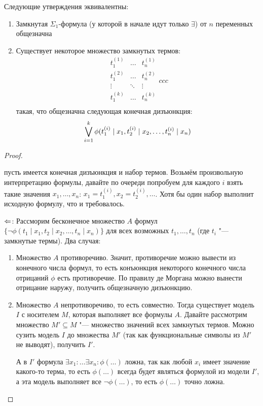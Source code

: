 \begin{theorem}[Эрбрана]
	Следующие утверждения эквивалентны:
	\begin{enumerate}
		\item
			Замкнутая $\Sigma_1$-формула (у которой в начале идут только $\exists$) от $n$ переменных общезначна
		\item
			Существует некоторое множество замкнутых термов:
			\[
			\begin{array}{ccc}
			t_1^{(1)} & \dots & t_n^{(1)} \\
			t_1^{(2)} & \dots & t_n^{(2)} \\
			\vdots & \ddots & \vdots \\
			t_1^{(k)} & \dots & t_n^{(k)} \\
			\end{array}{ccc}
			\]
			такая, что общезначна следующая конечная дизъюнкция:
			\[
				\bigvee_{i=1}^k
					\phi(t_1^{(i)}\mid x_1, t_2^{(i)} \mid x_2, \dots, t_n^{(i)} \mid x_n)
			\]
	\end{enumerate}
\end{theorem}
\begin{proof}
	\begin{description}
		\item[$\Ra$:]
			пусть имеется конечная дизъюнкция и набор термов.
			Возьмём произвольную интерпретацию формулы, давайте по очереди попробуем
			для каждого $i$ взять такие значения $x_1, \dots, x_n$:
			$x_1=t_1^{(i)}, x_2=t_2^{(i)}, \dots$.
			Хотя бы один набор выполнит исходную формулу, что и требовалось.
		\item{$\Leftarrow$:}
			Рассморим бесконечное множество $A$ формул $\{ \lnot \phi(t_1 \mid x_1, t_2 \mid x_2, \dots, t_n \mid x_n) \}$
			для всех возможных $t_1, \dots, t_n$ (где $t_i$ "--- замкнутые термы).
			Два случая:
			\begin{enumerate}
				\item
					Множество $A$ противоречиво.
					Значит, противоречие можно вывести из конечного числа формул,
					то есть конъюнкция некоторого конечного числа отрицаний $\phi$ есть противоречие.
					По правилу де Моргана можно вынести отрицание наружу, получить общезначную дизъюнкцию.
				\item
					Множество $A$ непротиворечиво, то есть совместно.
					Тогда существует модель $I$ с носителем $M$, которая выполняет все формулы $A$.
					Давайте рассмотрим множество $M' \subseteq M$ "--- множество значений всех
					замкнутых термов.
					Можно сузить модель $I$ до множества $M'$ (так как функциональные символы из $M'$
					не выводят), получить $I'$.

					А в $I'$ формула $\exists x_1 \colon \dots \exists x_n \colon \phi(\dots)$ ложна,
					так как любой $x_i$ имеет значение какого-то терма, то есть $\phi(\dots)$ всегда
					будет являться формулой из модели $I'$, а эта модель выполняет все $\lnot \phi(\dots)$,
					то есть $\phi(\dots)$ точно ложна.
			\end{enumerate}
	\end{description}
\end{proof}

